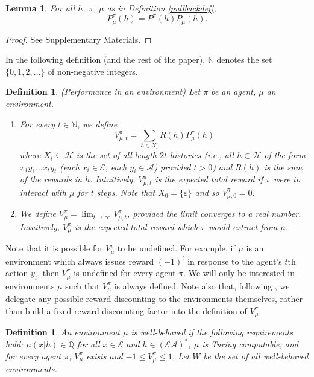 \documentclass[twoside]{article}
\newtheorem{definition}[theorem]{Definition}
\newtheorem{lemma}[theorem]{Lemma}
\begin{document}
\begin{lemma}
\label{factorizationlemma}
    For all $h$, $\pi$, $\mu$ as in Definition \ref{pullbackdef},
    \[
        P^\pi_\mu(h) = P^\pi(h)P_\mu(h).
    \]
\end{lemma}

\begin{proof}
    See Supplementary Materials.
\end{proof}

In the following definition (and the rest of the paper),
$\mathbb N$ denotes the set $\{0,1,2,\ldots\}$ of non-negative
integers.

\begin{definition}
\label{performancedefn}
    (Performance in an environment)
    Let $\pi$ be an agent, $\mu$ an environment.
    \begin{enumerate}
    \item
        For every $t\in\mathbb N$,
        we define
        \[
            V^\pi_{\mu,t}=\sum_{h\in X_t}R(h)P^\pi_\mu(h)
        \]
        where $X_t\subseteq\mathcal H$ is the set of all
        length-$2t$ histories (i.e., all $h\in\mathcal H$ of the form
        $x_1y_1\ldots x_ty_t$ (each $x_i\in\mathcal E$, each $y_i\in\mathcal A$)
        provided $t>0$) and $R(h)$ is the sum of the rewards in $h$.
        Intuitively, $V^\pi_{\mu,t}$ is the expected total reward
        if $\pi$ were to interact with $\mu$ for $t$ steps.
        Note that $X_0=\{\varepsilon\}$ and so $V^\pi_{\mu,0}=0$.
    \item
        We define $V^\pi_\mu=\lim_{t\to\infty}V^\pi_{\mu,t}$,
        provided the limit converges to a real number.
        Intuitively, $V^\pi_\mu$ is the expected total reward which $\pi$ would extract
        from $\mu$.
    \end{enumerate}
\end{definition}

Note that it is possible for $V^\pi_\mu$ to be undefined.
For example, if $\mu$ is an environment which always issues
reward $(-1)^t$ in response to the agent's $t$th action $y_t$,
then $V^\pi_\mu$ is undefined for every agent $\pi$.
We will only be interested in
environments $\mu$ such that $V^\pi_\mu$
is always defined. Note also that, following \cite{legg2007universal},
we delegate any possible reward discounting to the environments themselves,
rather than build a fixed reward discounting factor into the definition
of $V^\pi_\mu$.

\begin{definition}
\label{wellbehaveddefn}
    An environment $\mu$ is \emph{well-behaved} if the following
    requirements hold: $\mu(x|h)\in\mathbb Q$
    for all $x\in\mathcal E$ and $h\in (\mathcal E\mathcal A)^*$; $\mu$ is Turing
    computable; and for every agent $\pi$, $V^\pi_\mu$ exists and
    $-1\leq V^\pi_\mu\leq 1$. Let $W$ be the set of all well-behaved environments.
\end{definition}
\end{document}
